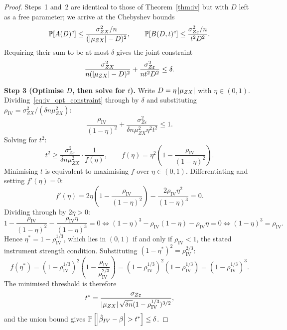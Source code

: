 \begin{proof}
    Steps~1 and~2 are identical to those of Theorem~\ref{thm:iv} but with $D$ left as a free parameter; we arrive at the Chebyshev bounds
    \[
        \operatorname{\mathbb{P}}[A(D)^c] \leq \frac{\sigma_{ZX}^2/n}{(\left|\mu_{ZX}\right|-D)^2}, \qquad \operatorname{\mathbb{P}}[B(D,t)^c] \leq \frac{\sigma_{Z\varepsilon}^2/n}{t^2 D^2}.
    \]
    Requiring their sum to be at most $\delta$ gives the joint constraint
    \begin{equation}
    \label{eq:iv_opt_constraint}
        \frac{\sigma_{ZX}^2}{n(\left|\mu_{ZX}\right|-D)^2} + \frac{\sigma_{Z\varepsilon}^2}{n t^2 D^2} \leq \delta.
    \end{equation}

    \medskip\noindent\textbf{Step 3 (Optimise $D$, then solve for $t$).}
    Write $D = \eta\left|\mu_{ZX}\right|$ with $\eta\in(0,1)$. Dividing~\eqref{eq:iv_opt_constraint} through by $\delta$ and substituting $\rho_\mathrm{IV} = \sigma_{ZX}^2/(\delta n\mu_{ZX}^2)$:
    \[
        \frac{\rho_\mathrm{IV}}{(1-\eta)^2} + \frac{\sigma_{Z\varepsilon}^2}{\delta n\mu_{ZX}^2\eta^2 t^2} \leq 1.
    \]
    Solving for $t^2$:
    \[
        t^2 \geq
        \frac{\sigma_{Z\varepsilon}^2}{\delta n\mu_{ZX}^2}
        \cdot \frac{1}{f(\eta)},
        \qquad
        f(\eta) = \eta^2\!\left(1 - \frac{\rho_\mathrm{IV}}{(1-\eta)^2}\right).
    \]
    Minimising $t$ is equivalent to maximising $f$ over $\eta\in(0,1)$. Differentiating and setting $f'(\eta)=0$:
    \[
        f'(\eta) = 2\eta\!\left(1 - \frac{\rho_\mathrm{IV}}{(1-\eta)^2}\right) - \frac{2\rho_\mathrm{IV}\eta^2}{(1-\eta)^3} = 0.
    \]
    Dividing through by $2\eta > 0$:
    \[
        1 - \frac{\rho_\mathrm{IV}}{(1-\eta)^2} - \frac{\rho_\mathrm{IV}\eta}{(1-\eta)^3} = 0 \iff (1-\eta)^3 - \rho_\mathrm{IV}(1-\eta) - \rho_\mathrm{IV}\eta = 0 \iff (1-\eta)^3 = \rho_\mathrm{IV}.
    \]
    Hence $\eta^* = 1 - \rho_\mathrm{IV}^{1/3}$, which lies in $(0,1)$ if and only if $\rho_\mathrm{IV} < 1$, the stated instrument strength condition. Substituting $(1-\eta^*)^2 = \rho_\mathrm{IV}^{2/3}$:
    \[
        f(\eta^*) = (1-\rho_\mathrm{IV}^{1/3})^2\!\left(1 - \frac{\rho_\mathrm{IV}}{\rho_\mathrm{IV}^{2/3}}\right) = (1-\rho_\mathrm{IV}^{1/3})^2(1 - \rho_\mathrm{IV}^{1/3}) = (1-\rho_\mathrm{IV}^{1/3})^3.
    \]
    The minimised threshold is therefore
    \[
        t^* = \frac{\sigma_{Z\varepsilon}}{\left|\mu_{ZX}\right|\sqrt{\delta n}(1-\rho_\mathrm{IV}^{1/3})^{3/2}},
    \]
    and the union bound gives $\Prob\left[\abs{\hat\beta_{IV}-\beta}>t^*\right]\leq\delta$.
\end{proof}

